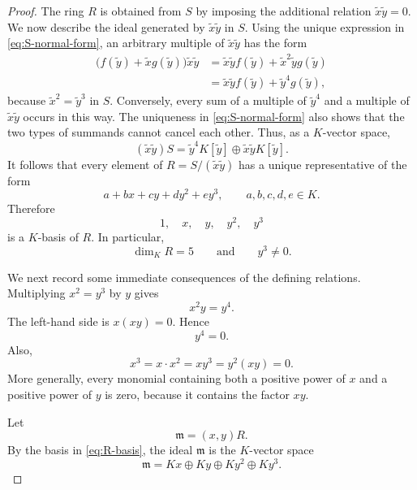 \documentclass[a4paper]{amsart}
\theoremstyle{definition}
\theoremstyle{remark}
\numberwithin{equation}{section}
\begin{document}
\begin{proof}
The ring $R$ is obtained from $S$ by imposing the additional relation
$\widetilde x\widetilde y=0$.  We now describe the ideal generated by
$\widetilde x\widetilde y$ in $S$.  Using the unique expression in
\eqref{eq:S-normal-form}, an arbitrary multiple of
$\widetilde x\widetilde y$ has the form
\begin{align*}
 \bigl(f(\widetilde y)+\widetilde xg(\widetilde y)\bigr)
 \widetilde x\widetilde y
 &=\widetilde x\widetilde y f(\widetilde y)
   +\widetilde x^2\widetilde y g(\widetilde y)\\
 &=\widetilde x\widetilde y f(\widetilde y)
   +\widetilde y^4g(\widetilde y),
\end{align*}
because $\widetilde x^2=\widetilde y^3$ in $S$.  Conversely, every
sum of a multiple of $\widetilde y^4$ and a multiple of
$\widetilde x\widetilde y$ occurs in this way.  The uniqueness in
\eqref{eq:S-normal-form} also
shows that the two types of summands cannot cancel each other.  Thus,
as a $K$-vector space,
\[
 (\widetilde x\widetilde y)S
 =\widetilde y^4K[\widetilde y]
  \mathbin{\oplus}
  \widetilde x\widetilde yK[\widetilde y].
\]
It follows that every element of
$R=S/(\widetilde x\widetilde y)$ has a unique representative of the
form
\[
 a+bx+cy+dy^2+ey^3,
 \qquad a,b,c,d,e\in K.
\]
Therefore
\begin{equation}\label{eq:R-basis}
 1,\quad x,\quad y,\quad y^2,\quad y^3
\end{equation}
is a $K$-basis of $R$.  In particular,
\[
 \dim_K R=5
 \qquad\text{and}\qquad
 y^3\neq 0.
\]

We next record some immediate consequences of the defining relations.
Multiplying $x^2=y^3$ by $y$ gives
\[
 x^2y=y^4.
\]
The left-hand side is $x(xy)=0$.  Hence
\begin{equation}\label{eq:y4zero}
 y^4=0.
\end{equation}
Also,
\[
 x^3=x\cdot x^2=xy^3=y^2(xy)=0.
\]
More generally, every monomial containing both a positive power of
$x$ and a positive power of $y$ is zero, because it contains the
factor $xy$.

Let
\[
 \mathfrak m=(x,y)R.
\]
By the basis in \eqref{eq:R-basis}, the ideal $\mathfrak m$ is the
$K$-vector space
\begin{equation}\label{eq:m-basis}
 \mathfrak m=Kx\oplus Ky\oplus Ky^2\oplus Ky^3.
\end{equation}



\end{proof}
\end{document}
